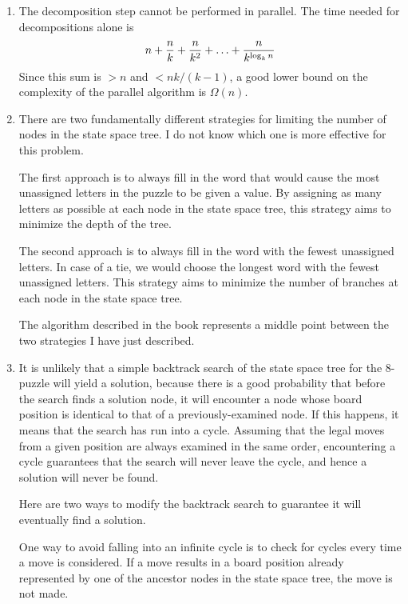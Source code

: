 \begin{enumerate}

\item The decomposition step cannot be performed in parallel.
      The time needed for decompositions alone is
      $$n + {{n}\over{k}} + {{n}\over{k^2}} + \ldots +
        {{n}\over{k^{\log_k n}}}$$
      Since this sum is $> n$ and $< nk/(k-1)$,
      a good lower bound on the complexity of the parallel algorithm is
      $\Omega(n)$.

\item There are two fundamentally different strategies for limiting the
      number of nodes in the state space tree. I do not know which one is 
      more effective for this problem.

      The first approach is to always fill in the word that would
      cause the most unassigned letters in the puzzle to be given a value.
      By assigning as many letters as possible at each node in the state
      space tree, this strategy aims to minimize the depth of the tree.

      The second approach is to always fill in the word with the fewest
      unassigned letters. In case of a tie, we would choose the longest word
      with the fewest unassigned letters.
      This strategy aims to minimize the number of branches at each node in
      the state space tree.

      The algorithm described in the book represents a middle point between
      the two strategies I have just described.

\item It is unlikely that a simple backtrack search of the state space tree for
      the 8-puzzle will yield a solution, because there is a good probability
      that before the search finds a solution node, it will encounter a node
      whose board position is identical to that of a previously-examined node.
      If this happens, it means that the search has run into a cycle. Assuming
      that the legal moves from a given position are always examined in the
      same order, encountering a cycle guarantees that the search will never
      leave the cycle, and hence a solution will never be found.

      Here are two ways to modify the backtrack search to guarantee it will
      eventually find a solution.

      One way to avoid falling into an infinite cycle is to check
      for cycles every time a move is considered.
      If a move results in a board position already represented by one of
      the ancestor nodes in the state space tree, the move is not made.


\end{enumerate}
